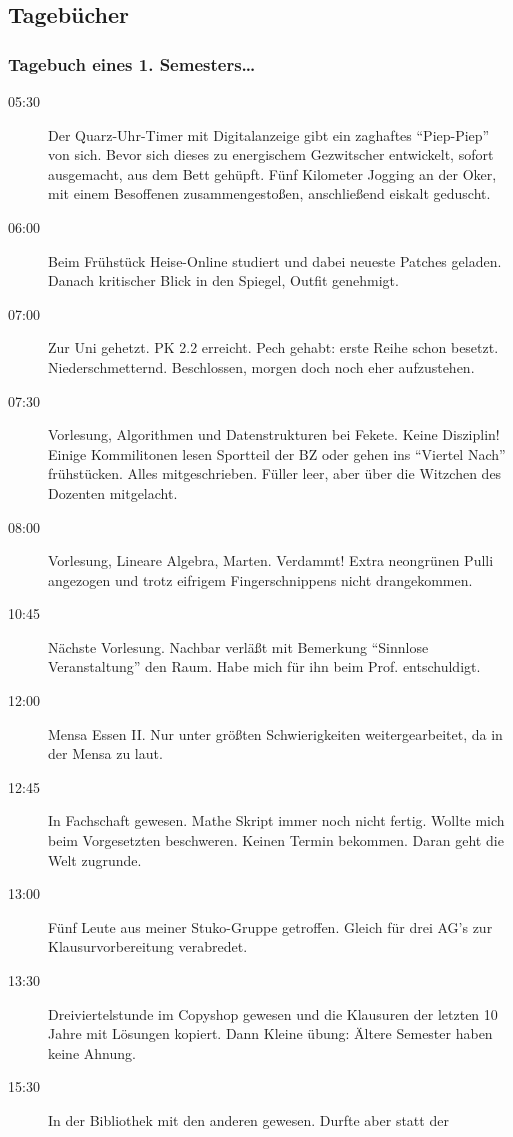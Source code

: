 \subsection{Tagebücher}
\subsubsection{Tagebuch eines 1. Semesters\ldots}

\begin{description}
\item[05:30] Der Quarz-Uhr-Timer mit Digitalanzeige gibt ein zaghaftes "`Piep-Piep"'
von sich. Bevor sich dieses zu energischem Gezwitscher entwickelt, sofort
ausgemacht, aus dem Bett gehüpft. Fünf Kilometer Jogging an der Oker,
mit einem Besoffenen zusammengestoßen, anschließend eiskalt geduscht.
\item[06:00] Beim Frühstück Heise-Online studiert und dabei neueste Patches geladen.
Danach kritischer Blick in den Spiegel, Outfit genehmigt.
\item[07:00] Zur Uni gehetzt. PK 2.2 erreicht. Pech gehabt: erste Reihe schon besetzt.
Niederschmetternd. Beschlossen, morgen doch noch eher aufzustehen.
\item[07:30] Vorlesung, Algorithmen und Datenstrukturen bei Fekete. Keine Disziplin!
Einige Kommilitonen lesen
Sportteil der BZ oder gehen ins "`Viertel Nach"' frühstücken. Alles
mitgeschrieben. Füller leer, aber über die Witzchen des Dozenten mitgelacht.
\item[08:00] Vorlesung, Lineare Algebra, Marten. Verdammt! Extra neongrünen Pulli
angezogen und trotz eifrigem Fingerschnippens nicht drangekommen.
\item[10:45] Nächste Vorlesung. Nachbar verläßt mit Bemerkung "`Sinnlose
Veranstaltung"' den Raum. Habe mich für ihn beim Prof. entschuldigt.
\item[12:00] Mensa Essen II. Nur unter größten Schwierigkeiten
weitergearbeitet, da in der Mensa zu laut.
\item[12:45] In Fachschaft gewesen. Mathe Skript immer noch nicht fertig. Wollte
mich beim Vorgesetzten beschweren. Keinen Termin bekommen. Daran geht die
Welt zugrunde.
\item[13:00] Fünf Leute aus meiner Stuko-Gruppe getroffen. Gleich für drei AG's zur
Klausurvorbereitung verabredet.
\item[13:30] Dreiviertelstunde im Copyshop gewesen und die Klausuren der letzten 10
Jahre mit Lösungen kopiert. Dann Kleine übung: Ältere Semester haben keine
Ahnung.
\item[15:30] In der Bibliothek mit den anderen gewesen. Durfte aber statt der

\end{description}

